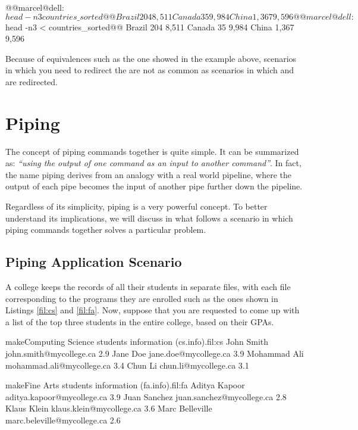 \begin{command_line}[Bash]
@@marcel@dell:~$ head -n3 countries\_sorted@@
Brazil    204     8,511
Canada    35      9,984
China     1,367	  9,596
@@marcel@dell:~$ head -n3 < countries\_sorted@@
Brazil    204     8,511
Canada    35      9,984
China     1,367	  9,596
\end{command_line}

Because of equivalences such as the one showed in the example above, scenarios in which you need to redirect the  are not as common as scenarios in which  and  are redirected.

\section{Piping}

The concept of piping commands together is quite simple. It can be summarized as: \textit{``using the output of one command as an input to another command''}. In fact, the name piping derives from an analogy with a real world pipeline, where the output of each pipe becomes the input of another pipe further down the pipeline.

Regardless of its simplicity, piping is a very powerful concept. To better understand its implications, we will discuss in what follows a scenario in which piping commands together solves a particular problem.

\subsection{Piping Application Scenario}

A college keeps the records of all their students in separate files, with each file corresponding to the programs they are enrolled such as the ones shown in Listings \ref{fil:cs} and \ref{fil:fa}. Now, suppose that you are requested to come up with a list of the top three students in the entire college, based on their GPAs.


\begin{command_line_float}{make}{Computing Science students information (cs.info).}{fil:cs}
John Smith john.smith@mycollege.ca 2.9
Jane Doe jane.doe@mycollege.ca 3.9
Mohammad Ali mohammad.ali@mycollege.ca 3.4
Chun Li chun.li@mycollege.ca 3.1
\end{command_line_float}

\begin{command_line_float}{make}{Fine Arts students information (fa.info).}{fil:fa}
Aditya Kapoor aditya.kapoor@mycollege.ca 3.9
Juan Sanchez juan.sanchez@mycollege.ca 2.8
Klaus Klein klaus.klein@mycollege.ca 3.6
Marc Belleville marc.beleville@mycollege.ca 2.6
\end{command_line_float}

